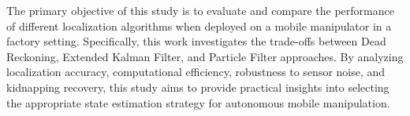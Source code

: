 The primary objective of this study is to evaluate and compare the performance of different localization algorithms when deployed on a mobile manipulator in a factory setting. 
Specifically, this work investigates the trade-offs between Dead Reckoning, Extended Kalman Filter, and Particle Filter approaches. 
By analyzing localization accuracy, computational efficiency, robustness to sensor noise, and kidnapping recovery, this study aims to provide practical insights into selecting the appropriate state estimation strategy for autonomous mobile manipulation.